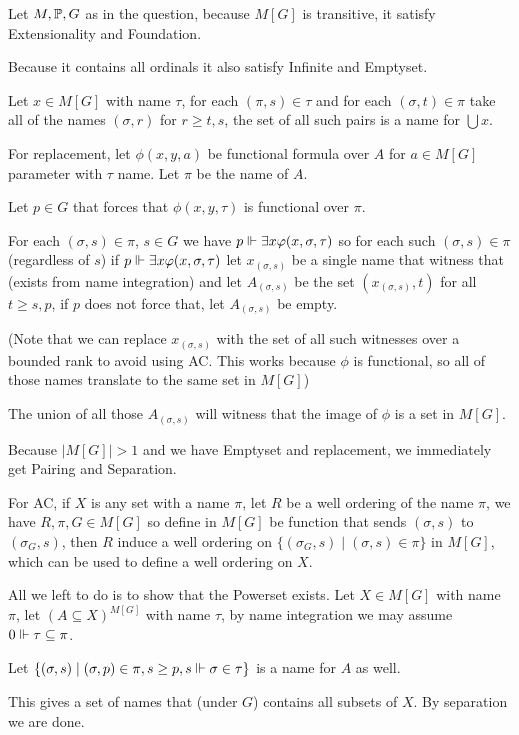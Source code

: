 \begin{cExercise}
	Let $M,\P,G$ as in the question, because $M[G]$ is transitive, it satisfy Extensionality and Foundation.
	
	Because it contains all ordinals it also satisfy Infinite and Emptyset.
	
	Let $x\in M[G]$ with name $\tau$, for each $(\pi,s)\in \tau$ and for each $(\sigma,t)\in\pi$ take all of the names $(\sigma,r)$ for $r\ge t,s$, the set of all such pairs is a name for $\bigcup x$.
	
	For replacement, let $\phi(x,y,a)$ be functional formula over $A$ for $a\in M[G]$ parameter with $\tau$ name. Let $\pi$ be the name of $A$.
	
	Let $p\in G$ that forces that $\phi(x,y,\tau)$ is functional over $\pi$.
	
	For each $(\sigma,s)\in\pi$, $s\in G$ we have $p\force \exists x\phi(x,\sigma,\tau)$ so for each such $(\sigma, s)\in \pi$ (regardless of $s$) if $p\force \exists x\phi(x,\sigma,\tau)$ let $x_{(\sigma,s)}$ be a single name that witness that (exists from name integration) and let $A_{(\sigma,s)}$ be the set $(x_{(\sigma,s)}, t)$ for all $t\ge s,p$, if $p$ does not force that, let $A_{(\sigma,s)}$ be empty.
	
	(Note that we can replace $x_{(\sigma,s)}$ with the set of all such witnesses over a bounded rank to avoid using AC. This works because $\phi$ is functional, so all of those names translate to the same set in $M[G]$)
	
	The union of all those $A_{(\sigma,s)}$ will witness that the image of $\phi$ is a set in $M[G]$.
	
	Because $|M[G]|>1$ and we have Emptyset and replacement, we immediately get Pairing and Separation.
	
	For AC, if $X$ is any set with a name $\pi$, let $R$ be a well ordering of the name $\pi$, we have $R,\pi,G\in M[G]$ so define in $M[G]$ be function that sends $(\sigma,s)$ to $(\sigma_G,s)$, then $R$ induce a well ordering on $\{(\sigma_G,s)\mid (\sigma,s)\in \pi\}$ in $M[G]$, which can be used to define a well ordering on $X$.
	
	All we left to do is to show that the Powerset exists. Let $X\in M[G]$ with name $\pi$, let $(A\subseteq X)^{M[G]}$ with name $\tau$, by name integration we may assume $0\force \tau\subseteq \pi$.
	
	Let $\{(\sigma,s)\mid (\sigma,p)\in\pi,s\ge p,s\force \sigma\in \tau\}$ is a name for $A$ as well.
	
	This gives a set of names that (under $G$) contains all subsets of $X$. By separation we are done.
\end{cExercise}





